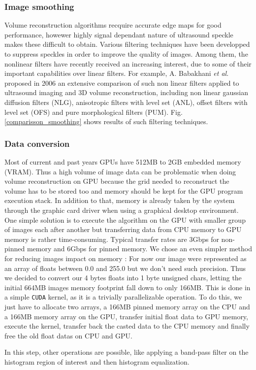 \documentclass[12pt,journal,compsoc]{IEEEtran}
\begin{document}
\subsubsection{Image smoothing}
Volume reconstruction algorithms recquire accurate edge maps for good performance, howewer highly signal dependant nature of ultrasound speckle makes these difficult to obtain. Various filtering techniques have been developped to suppress speckles in order to improve the quality of images. 
Among them, the nonlinear filters have recently received an increasing interest, due to some of their important capabilities over linear filters. For example, A. Babakhani \textit{et al.}\cite{1} proposed in 2006 an extensive comparison of such non linear filters applied to ultrasound imaging and 3D volume reconstruction, including non linear gaussian diffusion filters (NLG), anisotropic filters with level set (ANL), offset filters with level set (OFS) and pure morphological filters (PUM). Fig.\ref{comparisson_smoothing} shows results of such filtering techniques.\par

\subsubsection{Data conversion}

Most of current and past years GPUs have 512MB to 2GB embedded memory (VRAM). Thus a high volume of image data can be problematic when doing volume reconstruction on GPU because the grid needed to reconstruct the volume has to be stored too and memory should be kept for the GPU program execution stack. In addition to that, memory is already taken by the system through the graphic card driver when using a graphical desktop environment. 
One simple solution is to execute the algorithm on the GPU with smaller group of images each after another but transferring data from CPU memory to GPU memory is rather time-consuming. 
Typical transfer rates are 3Gbps for non-pinned memory and 6Gbps for pinned memory.
We chose an even simpler method for reducing images impact on memory : For now our image were represented as an array of floats between 0.0 and 255.0 but we don't need such precision. Thus we decided to convert our 4 bytes floats into 1 byte unsigned chars, letting the initial 664MB images memory footprint fall down to only 166MB. This is done in a simple \texttt{CUDA} kernel, as it is a trivially parallelizable operation. To do this, we just have to allocate two arrays, a 166MB pinned memory array on the CPU and a 166MB memory array on the GPU, transfer initial float data to GPU memory, execute the kernel, transfer back the casted data to the CPU memory and finally free the old float datas on CPU and GPU.\par
In this step, other operations are possible, like applying a band-pass filter on the histogram region of interest and then histogram equalization.
	
\end{document}
